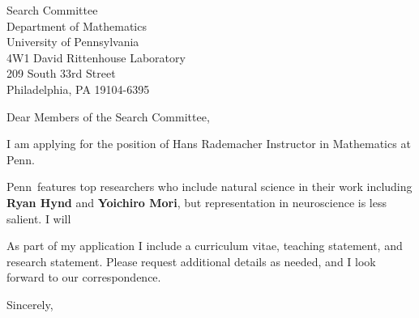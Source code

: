 \documentclass[11pt,a4paper]{letter}
\begin{document}

\def\School{Penn}

\begin{letter}
{Search Committee\\
Department of Mathematics\\
University of Pennsylvania\\
4W1 David Rittenhouse Laboratory\\
209 South 33rd Street\\
Philadelphia, PA 19104-6395
}


\opening{Dear Members of the Search Committee,}

I am applying for the position of Hans Rademacher Instructor in Mathematics at \School. 



\School~features top researchers who include natural science in their work including \textbf{Ryan Hynd} and \textbf{Yoichiro Mori}, but representation in neuroscience is less salient. I will 



As part of my application I include a curriculum vitae, teaching statement, and research statement. Please request additional details as needed, and I look forward to our correspondence.

\closing{Sincerely,}
\end{letter}
\end{document}
